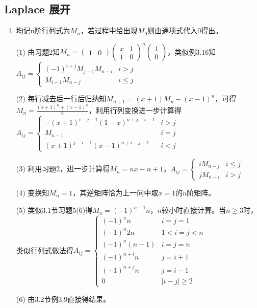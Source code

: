\documentclass[a4paper,UTF8,fontset=windows]{ctexart}
\begin{document}
\subsection{Laplace 展开}
\begin{enumerate}
\item
均记n阶行列式为$M_n$，若过程中给出现$M_0$则由通项式代入0得出。

(1) 由习题2知$M_n=\begin{pmatrix}1&0\end{pmatrix}\begin{pmatrix}x&1\\1&0\end{pmatrix}^n\begin{pmatrix}1\\0\end{pmatrix}$，类似例3.16知$A_{ij}=\begin{cases}(-1)^{i+j}M_{j-1}M_{n-i}&i>j\\M_{i-1}M_{n-j}&i\le j\end{cases}$

(2) 每行减去后一行后归纳知$M_{n+1}=(x+1)M_n-(x-1)^n$，可得$M_n=\frac{(x+1)^n+(x-1)^n}{2}$，利用行列变换进一步计算得$A_{ij}=\begin{cases}-(x+1)^{i-j-1}(1-x)^{n+j-i-1}&i>j\\M_{n-1}&i=j\\(x+1)^{j-i-1}(x-1)^{n+i-j-1}&i<j\end{cases}$

(3) 利用习题2，进一步计算得$M_n=nx-n+1$，$A_{ij}=\begin{cases}iM_{n-j}&i\le j\\jM_{n-i}&i>j\end{cases}$

(4) 变换知$M_n=1$，其逆矩阵恰为上一问中取$x=1$的$n$阶矩阵。

(5) 类似3.1节习题5(6)得$M_n=(-1)^{n-1}n$，$n$较小时直接计算。当$n\ge3$时，类似行列式做法得$A_{ij}=\begin{cases}(-1)^nn&i=j=1\\(-1)^n2n&1<i=j<n\\(-1)^n\left(n-1\right)&i=j=n\\(-1)^{n+i}n&j=i+1\\(-1)^{n+j}n&j=i-1\\0&|i-j|\ge2\end{cases}$

(6) 由3.2节例3.9直接得结果。


\end{enumerate}
\end{document}
